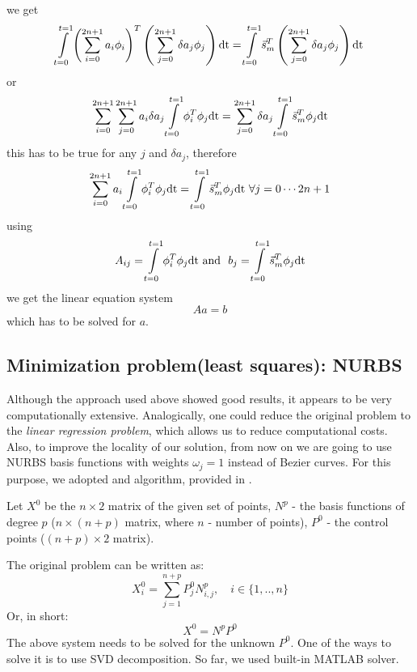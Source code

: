 we get
\begin{equation}
\int\limits_{t=0}^{t=1} \left(\sum\limits_{i=0}^{2n+1} a_{i}\phi_i
\right)^T
\left(\sum\limits_{j=0}^{2n+1}
\delta a_{j} \phi_j\right)\dt 
=
\int\limits_{t=0}^{t=1}\vec{s}_m^T \left(\sum\limits_{j=0}^{2n+1} \delta a_{j} \phi_j\right)\dt
\end{equation}
or
\begin{equation}
\sum\limits_{i=0}^{2n+1} \sum\limits_{j=0}^{2n+1}
a_{i} \delta a_{j}\int\limits_{t=0}^{t=1} \phi_i^T
\phi_j\dt 
=
\sum\limits_{j=0}^{2n+1} \delta a_{j} \int\limits_{t=0}^{t=1}\vec{s}_m^T \phi_j\dt
\end{equation}
this has to be true for any $j$ and $\delta a_j$, therefore 
\begin{equation}
\sum\limits_{i=0}^{2n+1} a_{i} \int\limits_{t=0}^{t=1} \phi_i^T
\phi_j\dt 
=
\int\limits_{t=0}^{t=1}\vec{s}_m^T \phi_j\dt \ \forall j=0\cdots 2n+1
\end{equation}
using
\begin{equation}
A_{ij}=\int\limits_{t=0}^{t=1} \phi_i^T
\phi_j\dt 
\text{\ and \ }
b_j=\int\limits_{t=0}^{t=1}\vec{s}_m^T \phi_j\dt
\end{equation}
we get the linear equation system
\begin{equation}
A a = b
\end{equation}
which has to be solved for $a$.

\subsection{Minimization problem(least squares): NURBS}
Although the approach used above showed good results, it appears to be very computationally extensive. Analogically, one could reduce the original problem to the \textit{linear regression problem}, which allows us to reduce computational costs. Also, to improve the locality of our solution, from now on we are going to use NURBS basis functions with weights $\omega_{j} = 1$ instead of Bezier curves. For this purpose, we adopted and algorithm, provided in \cite{becker2011advanced}.

Let $X^{0}$ be the $n \times 2$ matrix of the given set of points, $N^{p}$ - the basis functions of degree $p$ ($n \times (n+p)$ matrix, where $n$ - number of points), $P^{0}$ - the control points ($(n+p) \times 2$ matrix).

The original problem can be written as:
\begin{equation}
X_{i}^{0} = \sum\limits_{j=1}^{n+p} P_{j}^{0} N_{i,j}^{p}, \quad i \in \{1,..,n\}
\end{equation}
Or, in short:
\begin{equation}
X^{0} = N^{p} P^{0}
\end{equation}
The above system needs to be solved for the unknown $P^{0}$. One of the ways to solve it is to use SVD decomposition. So far, we used built-in MATLAB solver.

